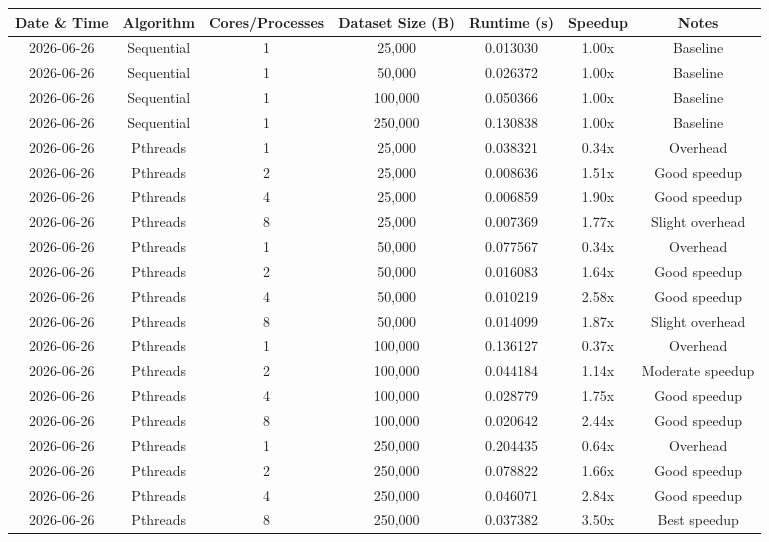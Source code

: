\documentclass[12pt]{article}
\begin{document}
\begin{longtable}{|c|c|c|c|c|c|c|}
\hline
\textbf{Date \& Time} & \textbf{Algorithm} & \textbf{Cores/Processes} & \textbf{Dataset Size (B)} & \textbf{Runtime (s)} & \textbf{Speedup} & \textbf{Notes} \\
\hline
\endhead
\hline
\endfoot
\hline
\endlastfoot

2026-06-26 & Sequential & 1 & 25,000 & 0.013030 & 1.00x & Baseline \\
2026-06-26 & Sequential & 1 & 50,000 & 0.026372 & 1.00x & Baseline \\
2026-06-26 & Sequential & 1 & 100,000 & 0.050366 & 1.00x & Baseline \\
2026-06-26 & Sequential & 1 & 250,000 & 0.130838 & 1.00x & Baseline \\
2026-06-26 & Pthreads & 1 & 25,000 & 0.038321 & 0.34x & Overhead \\
2026-06-26 & Pthreads & 2 & 25,000 & 0.008636 & 1.51x & Good speedup \\
2026-06-26 & Pthreads & 4 & 25,000 & 0.006859 & 1.90x & Good speedup \\
2026-06-26 & Pthreads & 8 & 25,000 & 0.007369 & 1.77x & Slight overhead \\
2026-06-26 & Pthreads & 1 & 50,000 & 0.077567 & 0.34x & Overhead \\
2026-06-26 & Pthreads & 2 & 50,000 & 0.016083 & 1.64x & Good speedup \\
2026-06-26 & Pthreads & 4 & 50,000 & 0.010219 & 2.58x & Good speedup \\
2026-06-26 & Pthreads & 8 & 50,000 & 0.014099 & 1.87x & Slight overhead \\
2026-06-26 & Pthreads & 1 & 100,000 & 0.136127 & 0.37x & Overhead \\
2026-06-26 & Pthreads & 2 & 100,000 & 0.044184 & 1.14x & Moderate speedup \\
2026-06-26 & Pthreads & 4 & 100,000 & 0.028779 & 1.75x & Good speedup \\
2026-06-26 & Pthreads & 8 & 100,000 & 0.020642 & 2.44x & Good speedup \\
2026-06-26 & Pthreads & 1 & 250,000 & 0.204435 & 0.64x & Overhead \\
2026-06-26 & Pthreads & 2 & 250,000 & 0.078822 & 1.66x & Good speedup \\
2026-06-26 & Pthreads & 4 & 250,000 & 0.046071 & 2.84x & Good speedup \\
2026-06-26 & Pthreads & 8 & 250,000 & 0.037382 & 3.50x & Best speedup \\

\end{longtable}
\end{document}

